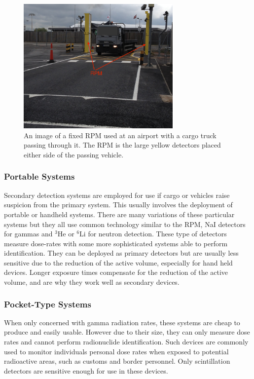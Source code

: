 \begin{figure}[htbp]
\begin{center}
\includegraphics[width=80mm]{Chapter5/figures/rpm2.png}
\caption{An image of a fixed RPM used at an airport with a cargo truck passing through it. The RPM is the large yellow detectors placed either side of the passing vehicle.}
\label{fig:RPMLorry}
\end{center}
\end{figure}

\subsubsection{Portable Systems}
Secondary detection systems are employed for use if cargo or vehicles raise suspicion from the primary system. This usually involves the deployment of portable or handheld systems. There are many variations of these particular systems but they all use common technology similar to the RPM, NaI detectors for gammas and $^{3}$He or $^{6}$Li for neutron detection. These type of detectors measure dose-rates with some more sophisticated systems able to perform identification. They can be deployed as primary detectors but are usually less sensitive due to the reduction of the active volume, especially for hand held devices. Longer exposure times compensate for the reduction of the active volume, and are why they work well as secondary devices.

\subsubsection{Pocket-Type Systems}
When only concerned with gamma radiation rates, these systems are cheap to produce and easily usable. However due to their size, they can only measure dose rates and cannot perform radionuclide identification. Such devices are commonly used to monitor individuals personal dose rates when exposed to potential radioactive areas, such as customs and border personnel. Only scintillation detectors are sensitive enough for use in these devices.

